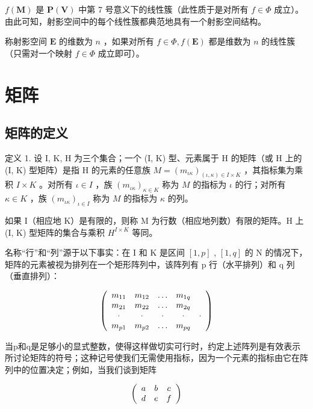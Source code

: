 \(f(\mathbf{M})\) 是 \(\mathbf{P}(\mathbf{V})\) 中第 7 号意义下的线性簇（此性质于是对所有 \(f \in \Phi\) 成立）。由此可知，射影空间中的每个线性簇都典范地具有一个射影空间结构。

称射影空间 \(\mathbf{E}\) 的维数为 \(n\) ，如果对所有 \(f\in\Phi,f(\mathbf{E})\) 都是维数为 \(n\) 的线性簇（只需对一个映射 \(f\in\Phi\) 成立即可）。

\section{矩阵}

\subsection{矩阵的定义}

定义 1. 设 I, K, H 为三个集合；一个 (I, K) 型、元素属于 H 的矩阵（或 H 上的 (I, K) 型矩阵）是指 H 的元素的任意族 \(M = (m_{\iota\kappa})_{(\iota, \kappa) \in I \times K}\) ，其指标集为乘积 \(I \times K\) 。对所有 \(\iota \in I\) ，族 \((m_{\iota\kappa})_{\kappa \in K}\) 称为 \(M\) 的指标为 \(\iota\) 的行；对所有 \(\kappa \in K\) ，族 \((m_{\iota\kappa})_{\iota \in I}\) 称为 \(M\) 的指标为 \(\kappa\) 的列。

如果 I（相应地 K）是有限的，则称 M 为行数（相应地列数）有限的矩阵。H 上 (I, K) 型矩阵的集合与乘积 \(H^{I \times K}\) 等同。

名称“行”和“列”源于以下事实：在 I 和 K 是区间 \([1,p]\) , \([1,q]\) 的 N 的情况下，矩阵的元素被视为排列在一个矩形阵列中，该阵列有 p 行（水平排列）和 q 列（垂直排列）：

\[
\left( \begin{array}{c c c c c} m _ {1 1} & m _ {1 2} & \ldots & m _ {1 q} \\ m _ {2 1} & m _ {2 2} & \ldots & m _ {2 q} \\ \cdot & \cdot & \cdot & \cdot & \cdot \\ m _ {p 1} & m _ {p 2} & \ldots & m _ {p q} \end{array} \right)
\]

当p和q是足够小的显式整数，使得这样做切实可行时，约定上述阵列是有效表示所讨论矩阵的符号；这种记号使我们无需使用指标，因为一个元素的指标由它在阵列中的位置决定；例如，当我们谈到矩阵

\[
\left( \begin{array}{c c c} a & b & c \\ d & e & f \end{array} \right)
\]

